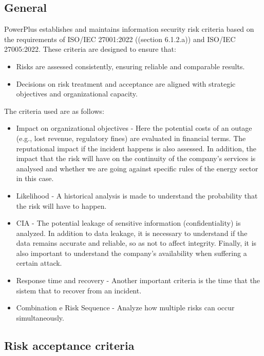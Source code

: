 \subsection{General}
PowerPlus establishes and maintains information security risk criteria based on the requirements of ISO/IEC 27001:2022 ((section 6.1.2.a)) and ISO/IEC 27005:2022. These criteria are designed to ensure that:
\begin{itemize}
    \item Risks are assessed consistently, ensuring reliable and comparable results.
    \item Decisions on risk treatment and acceptance are aligned with strategic objectives and organizational capacity.
\end{itemize}
The criteria used are as follows:
\begin{itemize}
    \item Impact on organizational objectives - Here the potential costs of an outage (e.g., lost revenue, regulatory fines) are evaluated in financial terms. The reputational impact if the incident happens is also assessed.  In addition, the impact that the risk will have on the continuity of the company's services is analysed and whether we are going against specific rules of the energy sector in this case.
    \item Likelihood - A historical analysis is made to understand the probability that the risk will have to happen.
    \item CIA - The potential leakage of sensitive information (confidentiality) is analyzed. In addition to data leakage, it is necessary to understand if the data remains accurate and reliable, so as not to affect integrity. Finally, it is also important to understand the company's availability when suffering a certain attack.
    \item Response time and recovery - Another important criteria is the time that the sistem that to recover from an incident.
    \item Combination e Risk Sequence - Analyze how multiple risks can occur simultaneously.
\end{itemize}

\subsection{Risk acceptance criteria}

